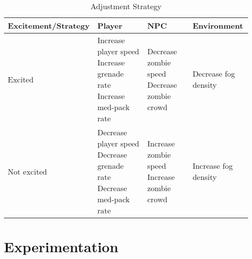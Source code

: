 \documentclass[conference]{IEEEtran}
\begin{document}
\begin{table*}[!t]
\caption{Adjustment Strategy}
\label{tbl:adjustment-strategy}
\hfil
\centering
\begin{tabular}{lp{3cm}p{3cm}p{3cm}}
\hline
Excitement/Strategy               & Player                         & NPC                            & Environment \\
\hline
Excited                           & Increase player speed \newline
                                     Increase grenade rate \newline
                                     Increase med-pack rate         & Decrease zombie speed \newline
                                                                      Decrease zombie crowd          & Decrease fog density \\
\hline
Not excited                       & Decrease player speed \newline
                                     Decrease grenade rate \newline
                                     Decrease med-pack rate         & Increase zombie speed \newline
                                                                      Increase zombie crowd          & Increase fog density \\
\hline
\end{tabular}
\end{table*}


\section{Experimentation}
\label{sec:exprm}
\end{document}
